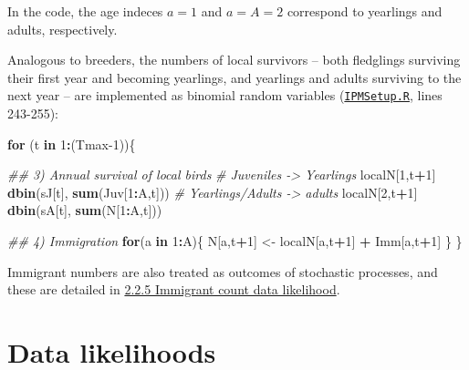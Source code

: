 \documentclass[
]{book}
\newenvironment{Shaded}{\begin{snugshade}}{\end{snugshade}}
\newcommand{\CommentTok}[1]{\textcolor[rgb]{0.56,0.35,0.01}{\textit{#1}}}
\newcommand{\ControlFlowTok}[1]{\textcolor[rgb]{0.13,0.29,0.53}{\textbf{#1}}}
\newcommand{\DecValTok}[1]{\textcolor[rgb]{0.00,0.00,0.81}{#1}}
\newcommand{\KeywordTok}[1]{\textcolor[rgb]{0.13,0.29,0.53}{\textbf{#1}}}
\newcommand{\NormalTok}[1]{#1}
\newcommand{\OperatorTok}[1]{\textcolor[rgb]{0.81,0.36,0.00}{\textbf{#1}}}
\newcommand{\StringTok}[1]{\textcolor[rgb]{0.31,0.60,0.02}{#1}}
\begin{document}
In the code, the age indeces \(a=1\) and \(a=A=2\) correspond to yearlings and
adults, respectively.

Analogous to breeders, the numbers of local survivors -- both fledglings surviving their
first year and becoming yearlings, and yearlings and adults surviving to the
next year -- are implemented as binomial random variables (\href{https://github.com/SPI-Birds/SPI-IPM/blob/main/SPI-IPM_Code/02-04_IPM_Setup\&Run/IPMSetup.R}{\texttt{IPMSetup.R}}, lines 243-255):

\begin{Shaded}
\begin{Highlighting}[]
\ControlFlowTok{for}\NormalTok{ (t }\ControlFlowTok{in} \DecValTok{1}\OperatorTok{:}\NormalTok{(Tmax}\DecValTok{-1}\NormalTok{))\{}
  
  \CommentTok{## 3) Annual survival of local birds}
  \CommentTok{# Juveniles -> Yearlings}
\NormalTok{  localN[}\DecValTok{1}\NormalTok{,t}\OperatorTok{+}\DecValTok{1}\NormalTok{] }\OperatorTok{~}\StringTok{ }\KeywordTok{dbin}\NormalTok{(sJ[t], }\KeywordTok{sum}\NormalTok{(Juv[}\DecValTok{1}\OperatorTok{:}\NormalTok{A,t]))}
  \CommentTok{# Yearlings/Adults -> adults}
\NormalTok{  localN[}\DecValTok{2}\NormalTok{,t}\OperatorTok{+}\DecValTok{1}\NormalTok{] }\OperatorTok{~}\StringTok{ }\KeywordTok{dbin}\NormalTok{(sA[t], }\KeywordTok{sum}\NormalTok{(N[}\DecValTok{1}\OperatorTok{:}\NormalTok{A,t]))}
  
  \CommentTok{## 4) Immigration}
  \ControlFlowTok{for}\NormalTok{(a }\ControlFlowTok{in} \DecValTok{1}\OperatorTok{:}\NormalTok{A)\{}
\NormalTok{    N[a,t}\OperatorTok{+}\DecValTok{1}\NormalTok{] <-}\StringTok{ }\NormalTok{localN[a,t}\OperatorTok{+}\DecValTok{1}\NormalTok{] }\OperatorTok{+}\StringTok{ }\NormalTok{Imm[a,t}\OperatorTok{+}\DecValTok{1}\NormalTok{]}
\NormalTok{  \}}
\NormalTok{\}}
\end{Highlighting}
\end{Shaded}

Immigrant numbers are also treated as outcomes of stochastic processes, and
these are detailed in \protect\hyperlink{ux5cux23ux5cux23ux5cux2520Immigrantux5cux2520countux5cux2520dataux5cux2520likelihood}{2.2.5 Immigrant count data likelihood}.

\hypertarget{data-likelihoods}{%
\section{Data likelihoods}\label{data-likelihoods}}
\end{document}
